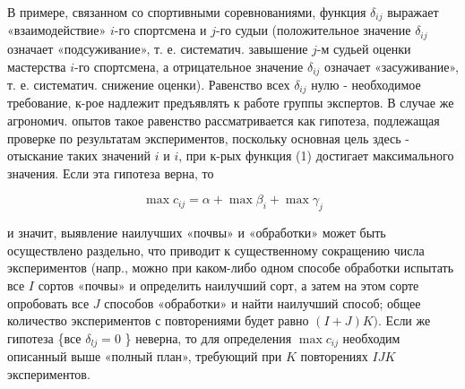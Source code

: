 \documentclass[10pt]{article}
\begin{document}
В примере, связанном со спортивными соревнованиями, функция $\delta_{i j}$ выражает «взаимодействие» $i$-го спортсмена и $j$-го судыи (положительное значение $\delta_{i j}$ означает «подсуживание», т. е. систематич. завышение $j$-м судьей оценки мастерства $i$-го спортсмена, а отрицательное значение $\delta_{i j}$ означает «засуживание», т. е. систематич. снижение оценки). Равенство всех $\delta_{i j}$ нулю - необходимое требование, к-рое надлежит предъявлять к работе группы экспертов. В случае же агрономич. опытов такое равенство рассматривается как гипотеза, подлежащая проверке по результатам экспериментов, поскольку основная цель здесь - отыскание таких значений $i$ и $i$, при к-рых функция (1) достигает максимального значения. Если эта гипотеза верна, то



\[

\max c_{i j}=\alpha+\max \beta_{i}+\max \gamma_{j}

\]



и значит, выявление наилучших «почвы» и «обработки» может быть осуществлено раздельно, что приводит к существенному сокращению числа экспериментов (напр., можно при каком-либо одном способе обработки испытать все $I$ сортов «почвы» и определить наилучший сорт, а затем на этом сорте опробовать все $J$ способов «обработки» и найти наилучший способ; общее количество экспериментов с повторениями будет равно $(I+J) K)$. Если же гипотеза \{все $\delta_{l j}=0$ \} неверна, то для определения $\max c_{i j}$ необходим описанный выше «полный план», требующий при $K$ повторениях $I J K$ экспериментов.
\end{document}
